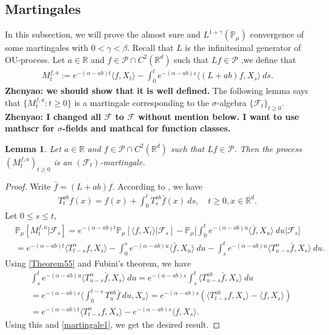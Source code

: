\documentclass[12pt,oneside,english]{amsart}
\theoremstyle{plain}
\newtheorem{lem}[thm]{Lemma}
\theoremstyle{definition}
\numberwithin{equation}{section}
\newcommand{\added}[1]{{\color{blue}#1}}\newcommand{\deleted}[1]{{\color{red}#1}}
\begin{document}
\subsection{Martingales}
    In this subsection, we will prove the almost sure and $L^{1+\gamma}(\mathbb{P}_{\mu})$ convergence of some martingales with $0<\gamma<\beta$. Recall that $L$ is the infinitesimal generator of OU-process. Let $a\in \mathbb{R}$ and $f\in \mathcal{P}\cap C^2(\mathbb{R}^d)$ such that $Lf \in \mathcal{P}$ ,we define that
\begin{align}
\label{defmartingale}
    M_t^{f,a}:=e^{-(\alpha-ab)t}\langle f,X_t\rangle-\int_0^t e^{-(\alpha-ab)s}\langle (L+ab)f, X_s\rangle~ ds.
\end{align}
{\bf Zhenyao: we should show that it is well defined.}
    The following lemma says that $\{M_t^{f,a}: t\geq 0\}$ is a martingale corresponding to the $\sigma$-algebra \added{$\{\mathscr{F}_t\}_{t\geq 0}$}.
{\bf Zhenyao: I changed all $\mathcal F$ to $\mathscr F$ without mention below. I want to use mathscr for $\sigma$-fields and mathcal for function classes.}
\begin{lem}
\label{lemma25}
    Let $a\in \mathbb R$ and $f\in \mathcal{P}\cap C^2(\mathbb{R}^d)$ such that $Lf \in \mathcal{P}$. Then the process $(M_t^{f,a})_{t\geq 0}$ is an $(\mathscr F_t)$-martingale.
\end{lem}
\begin{proof}
    Write $\bar{f}=(L+ab)f$. According to \cite[Theorem A.55]{Li2011Measure-valued}, we have
\begin{align}\label{Theorem55}
    T_t^{ab}f(x)= f(x)+\int_0^t T_s^{ab}\bar{f}(x)~ds,\quad t\geq 0,x\in \mathbb{R}^d.
\end{align}
Let $0\leq s\leq t$,
\begin{align}
\label{martingale1}
    &\mathbb{P}_{\mu}[M_t^{f,a}|\mathscr{F}_s]
    =e^{-(\alpha-ab)t}\mathbb{P}_{\mu}\left[\langle f,X_t\rangle|\mathscr{F}_s\right]-\mathbb{P}_{\mu}\Big[\int_0^t e^{-(\alpha-ab)u}\langle \bar{f}, X_u\rangle~ du\Big|\mathscr{F}_s\big]
    \\&=e^{-(\alpha-ab)t}\langle T_{t-s}^{\alpha}f, X_s\rangle-\int_0^s e^{-(\alpha-ab)u}\langle \bar{f}, X_u\rangle~ du -\int_s^t e^{-(\alpha-ab)u}\langle T_{u-s}^{\alpha} \bar{f},X_s\rangle~ du.
\end{align}
    Using \eqref{Theorem55} and Fubini's theorem, we have
\begin{align}
    &\int_s^t e^{-(\alpha-ab)u}\langle T_{u-s}^{\alpha} \bar{f},X_s\rangle~ du=e^{-(\alpha-ab)s}\int_s^t\langle T_{u-s}^{ab}\bar{f},X_s\rangle~du\\
    &=e^{-(\alpha-ab)s}\Big\langle\int_0^{t-s}T_{u}^{ab}\bar{f}~du,X_s\Big\rangle=e^{-(\alpha-ab)s}\left(\langle T_{t-s}^{ab}f,X_s\rangle-\langle
    f,X_s\rangle\right)\\
    &=e^{-(\alpha-ab)t}\langle T_{t-s}^{\alpha}f, X_s\rangle-e^{-(\alpha-ab)s}\langle
    f,X_s\rangle.
\end{align}
   Using this and \eqref{martingale1}, we get the desired result.
\end{proof}
\end{document}
